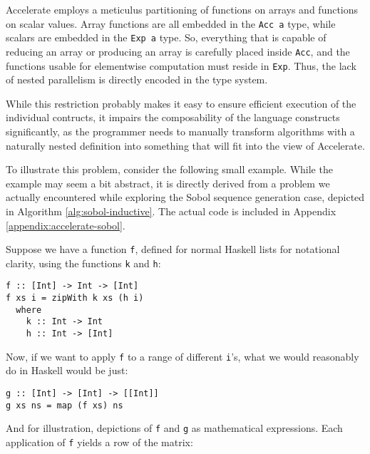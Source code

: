 Accelerate employs a meticulus partitioning of functions on arrays and functions
on scalar values. Array functions are all embedded in the \texttt{Acc a} type,
while scalars are embedded in the \texttt{Exp a} type. So, everything that is
capable of reducing an array or producing an array is carefully placed inside
\texttt{Acc}, and the functions usable for elementwise computation must
reside in \texttt{Exp}. Thus, the lack of nested parallelism is directly
encoded in the type system.

While this restriction probably makes it easy to ensure efficient execution of
the individual contructs, it impairs the composability of the language
constructs significantly, as the programmer needs to manually transform
algorithms with a naturally nested definition into something that will fit into
the view of Accelerate.

To illustrate this problem, consider the following small example.  While the example may seem a bit
abstract, it is directly derived from a problem we actually encountered while exploring
the Sobol sequence generation case, depicted in Algorithm
\ref{alg:sobol-inductive}. The actual code is included in Appendix
\ref{appendix:accelerate-sobol}.

Suppose we have a function \texttt{f}, defined for normal Haskell lists for notational clarity,
using the functions \texttt{k} and \texttt{h}:

\begin{verbatim}
f :: [Int] -> Int -> [Int]
f xs i = zipWith k xs (h i)
  where
    k :: Int -> Int
    h :: Int -> [Int]
\end{verbatim}

Now, if we want to apply \texttt{f} to a range of different \texttt{i}'s, what
we would reasonably do in Haskell would be just:

\begin{verbatim}
g :: [Int] -> [Int] -> [[Int]]
g xs ns = map (f xs) ns
\end{verbatim}

And for illustration, depictions of \texttt{f} and \texttt{g} as mathematical
expressions. Each application of \texttt{f} yields a row of the matrix:

